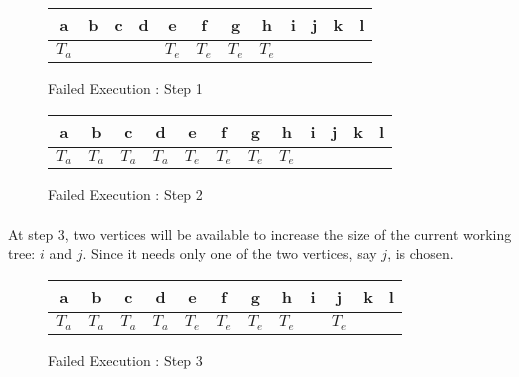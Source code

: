 \begin{figure}[H]
  \caption{Failed Execution : Step 1}
  \begin{center}
    \begin{tikzpicture}[scale=0.9,transform shape]
      
    \end{tikzpicture}
    \begin{tabular}{|c|c|c|c|c|c|c|c|c|c|c|c|}
\hline
a & b & c & d & e & f & g & h & i & j & k & l\\
\hline
$T_a$ & & & & $T_e$ & $T_e$ & $T_e$ & $T_e$ & & & &\\
\hline
    \end{tabular}
  \end{center}
\end{figure}

\begin{figure}[H]
  \caption{Failed Execution : Step 2}
  \begin{center}
    \begin{tikzpicture}[scale=0.9,transform shape]
      
    \end{tikzpicture}
    \begin{tabular}{|c|c|c|c|c|c|c|c|c|c|c|c|}
\hline
a & b & c & d & e & f & g & h & i & j & k & l\\
\hline
$T_a$ & $T_a$ & $T_a$ & $T_a$ & $T_e$ & $T_e$ & $T_e$ & $T_e$ & & & &\\
\hline
    \end{tabular}
  \end{center}
\end{figure}

\paragraph{}
At step 3, two vertices will be available to increase the size of the current
working tree: $i$ and $j$. Since it needs only one of the two vertices, say
$j$,  is chosen.

\begin{figure}[H]
  \caption{Failed Execution : Step 3}
  \begin{center}
    \begin{tikzpicture}[scale=0.9,transform shape]
      
    \end{tikzpicture}
    \begin{tabular}{|c|c|c|c|c|c|c|c|c|c|c|c|}
\hline
a & b & c & d & e & f & g & h & i & j & k & l\\
\hline
$T_a$ & $T_a$ & $T_a$ & $T_a$ & $T_e$ & $T_e$ & $T_e$ & $T_e$ & & $T_e$ & &\\
\hline
    \end{tabular}
  \end{center}
\end{figure}

